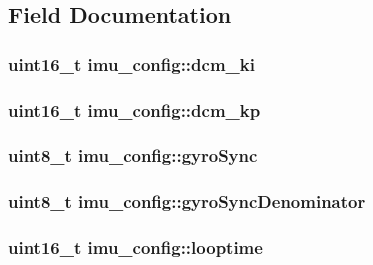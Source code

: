 \subsection{Field Documentation}
\hypertarget{structimu__config_abcb1aa0b81bdbb4743d5595b96d200e6}{
\subsubsection[{dcm\+\_\+ki}]{\setlength{\rightskip}{0pt plus 5cm}uint16\+\_\+t imu\+\_\+config\+::dcm\+\_\+ki}}\label{structimu__config_abcb1aa0b81bdbb4743d5595b96d200e6}
\hypertarget{structimu__config_abf09e7444eb000d10d9ba9a63574f396}{
\subsubsection[{dcm\+\_\+kp}]{\setlength{\rightskip}{0pt plus 5cm}uint16\+\_\+t imu\+\_\+config\+::dcm\+\_\+kp}}\label{structimu__config_abf09e7444eb000d10d9ba9a63574f396}
\hypertarget{structimu__config_a3d6166552e4f2074be6634b4036d6101}{
\subsubsection[{gyro\+Sync}]{\setlength{\rightskip}{0pt plus 5cm}uint8\+\_\+t imu\+\_\+config\+::gyro\+Sync}}\label{structimu__config_a3d6166552e4f2074be6634b4036d6101}
\hypertarget{structimu__config_ad73b17111bcfa72dfb6b339923757386}{
\subsubsection[{gyro\+Sync\+Denominator}]{\setlength{\rightskip}{0pt plus 5cm}uint8\+\_\+t imu\+\_\+config\+::gyro\+Sync\+Denominator}}\label{structimu__config_ad73b17111bcfa72dfb6b339923757386}
\hypertarget{structimu__config_aa5d7a7731eba81f81432f69d0569f839}{
\subsubsection[{looptime}]{\setlength{\rightskip}{0pt plus 5cm}uint16\+\_\+t imu\+\_\+config\+::looptime}}\label{structimu__config_aa5d7a7731eba81f81432f69d0569f839}
